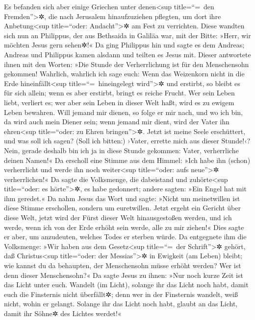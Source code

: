  Es befanden sich aber einige Griechen unter
denen\textless sup title=``=~den Fremden''\textgreater✲, die nach
Jerusalem hinaufzuziehen pflegten, um dort ihre Anbetung\textless sup
title=``oder: Andacht''\textgreater✲ am Fest zu verrichten.
 Diese wandten sich nun an Philippus, der aus Bethsaida
in Galiläa war, mit der Bitte: »Herr, wir möchten Jesus gern sehen✲!«
 Da ging Philippus hin und sagte es dem Andreas; Andreas
und Philippus kamen alsdann und teilten es Jesus mit. 
Dieser antwortete ihnen mit den Worten: »Die Stunde der Verherrlichung
ist für den Menschensohn gekommen!  Wahrlich, wahrlich
ich sage euch: Wenn das Weizenkorn nicht in die Erde
hineinfällt\textless sup title=``=~hineingelegt wird''\textgreater✲ und
erstirbt, so bleibt es für sich allein; wenn es aber erstirbt, bringt es
reiche Frucht.  Wer sein Leben liebt, verliert es; wer
aber sein Leben in dieser Welt haßt, wird es zu ewigem Leben bewahren.
 Will jemand mir dienen, so folge er mir nach, und wo ich
bin, da wird auch mein Diener sein; wenn jemand mir dient, wird der
Vater ihn ehren\textless sup title=``oder: zu Ehren
bringen''\textgreater✲.  Jetzt ist meine Seele
erschüttert, und was soll ich sagen? (Soll ich bitten:) ›Vater, errette
mich aus dieser Stunde!‹? Nein, gerade deshalb bin ich ja in diese
Stunde gekommen:  Vater, verherrliche deinen Namen!« Da
erscholl eine Stimme aus dem Himmel: »Ich habe ihn (schon) verherrlicht
und werde ihn noch weiter\textless sup title=``oder: aufs
neue''\textgreater✲ verherrlichen!«  Da sagte die
Volksmenge, die dabeistand und zuhörte\textless sup title=``oder: es
hörte''\textgreater✲, es habe gedonnert; andere sagten: »Ein Engel hat
mit ihm geredet.«  Da nahm Jesus das Wort und sagte:
»Nicht um meinetwillen ist diese Stimme erschollen, sondern um
euretwillen.  Jetzt ergeht ein Gericht über diese Welt,
jetzt wird der Fürst dieser Welt hinausgestoßen werden, 
und ich werde, wenn ich von der Erde erhöht sein werde, alle zu mir
ziehen!«  Dies sagte er aber, um anzudeuten, welches
Todes er sterben würde.  Da entgegnete ihm die
Volksmenge: »Wir haben aus dem Gesetz\textless sup title=``=~der
Schrift''\textgreater✲ gehört, daß Christus\textless sup title=``oder:
der Messias''\textgreater✲ in Ewigkeit (am Leben) bleibt; wie kannst du
da behaupten, der Menschensohn müsse erhöht werden? Wer ist denn dieser
Menschensohn?«  Da sagte Jesus zu ihnen: »Nur noch kurze
Zeit ist das Licht unter euch. Wandelt (im Licht), solange ihr das Licht
noch habt, damit euch die Finsternis nicht überfällt✲; denn wer in der
Finsternis wandelt, weiß nicht, wohin er gelangt. 
Solange ihr das Licht noch habt, glaubt an das Licht, damit ihr Söhne✲
des Lichtes werdet!«

